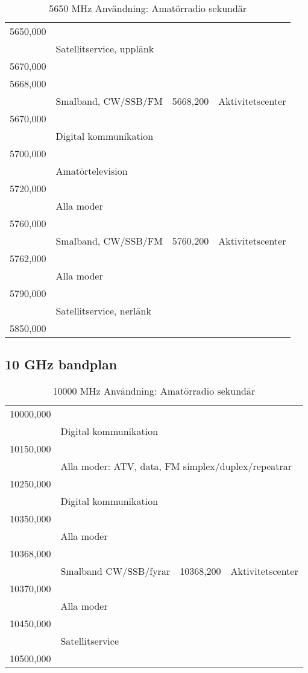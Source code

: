\setlongtables
\begin{longtable}{llll}
\caption{5650 MHz Användning: Amatörradio sekundär} \\
5650,000 & & & \\
         & \multicolumn{3}{l}{Satellitservice, upplänk} \\
5670,000 & & & \\
5668,000 & & & \\
         & Smalband, CW/SSB/FM & 5668,200 & Aktivitetscenter \\
5670,000 & & & \\
         & Digital kommunikation & & \\
5700,000 & & & \\
         & Amatörtelevision & & \\
5720,000 & & & \\
         & Alla moder & & \\
5760,000 & & & \\
         & Smalband, CW/SSB/FM & 5760,200 & Aktivitetscenter \\
5762,000 & & & \\
         & Alla moder & & \\
5790,000 & & & \\
         & \multicolumn{3}{l}{Satellitservice, nerlänk} \\
5850,000 & & & \\
\end{longtable}

\subsection{10 GHz bandplan}

\setlongtables
\begin{longtable}{llll}
\caption{10000 MHz Användning: Amatörradio sekundär} \\
10000,000 & & & \\
          & \multicolumn{3}{l}{Digital kommunikation} \\
10150,000 & & & \\
          & \multicolumn{3}{l}{Alla moder: ATV, data, FM simplex/duplex/repeatrar} \\
10250,000 & & & \\
          & \multicolumn{3}{l}{Digital kommunikation} \\
10350,000 & & & \\
          & \multicolumn{3}{l}{Alla moder} \\
10368,000 & & & \\
          & Smalband CW/SSB/fyrar & 10368,200 & Aktivitetscenter \\
10370,000 & & & \\
          & \multicolumn{3}{l}{Alla moder} \\
10450,000 & & & \\
          & \multicolumn{3}{l}{Satellitservice} \\
10500,000 & & & \\
\end{longtable}

